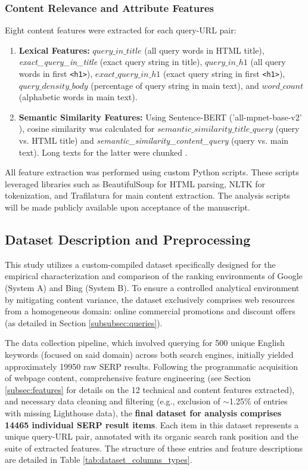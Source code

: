 \documentclass[a4paper,fleqn]{cas-sc}
\newcommand{\longvar}[1]{\textit{#1}}
\begin{document}
\subsubsection{Content Relevance and Attribute Features}
\label{subsubsec:content_features}
Eight content features were extracted for each query-URL pair:
\begin{enumerate}
    \item \textbf{Lexical Features:} $query\_in\_title$ (all query words in HTML title), \longvar{exact_query_in_title} (exact query string in title), $query\_in\_h1$ (all query words in first \texttt{<h1>}), $exact\_query\_in\_h1$ (exact query string in first \texttt{<h1>}), $query\_density\_body$ (percentage of query string in main text), and $word\_count$ (alphabetic words in main text).
    \item \textbf{Semantic Similarity Features:} Using Sentence-BERT ('all-mpnet-base-v2' \citep{Reimers2019, Song2020}), cosine similarity was calculated for $semantic\_similarity\_title\_query$ (query vs. HTML title) and \longvar{semantic_similarity_content_query} (query vs. main text). Long texts for the latter were chunked \citep{Beltagy2020, Devlin2019}.
\end{enumerate}
All feature extraction was performed using custom Python scripts. These scripts leveraged libraries such as BeautifulSoup for HTML parsing, NLTK for tokenization, and Trafilatura for main content extraction. The analysis scripts will be made publicly available upon acceptance of the manuscript.

\subsection{Dataset Description and Preprocessing}
\label{subsec:assembly}
This study utilizes a custom-compiled dataset specifically designed for the empirical characterization and comparison of the ranking environments of Google (System A) and Bing (System B). To ensure a controlled analytical environment by mitigating content variance, the dataset exclusively comprises web resources from a homogeneous domain: online commercial promotions and discount offers (as detailed in Section \ref{subsubsec:queries}).

The data collection pipeline, which involved querying for 500 unique English keywords (focused on said domain) across both search engines, initially yielded approximately \num{19950} raw SERP results. Following the programmatic acquisition of webpage content, comprehensive feature engineering (see Section \ref{subsec:features} for details on the 12 technical and content features extracted), and necessary data cleaning and filtering (e.g., exclusion of $\sim$1.25\% of entries with missing Lighthouse data), the \textbf{final dataset for analysis comprises \num{14465} individual SERP result items}. Each item in this dataset represents a unique query-URL pair, annotated with its organic search rank position and the suite of extracted features. The structure of these entries and feature descriptions are detailed in Table \ref{tab:dataset_columns_types}.
\end{document}
